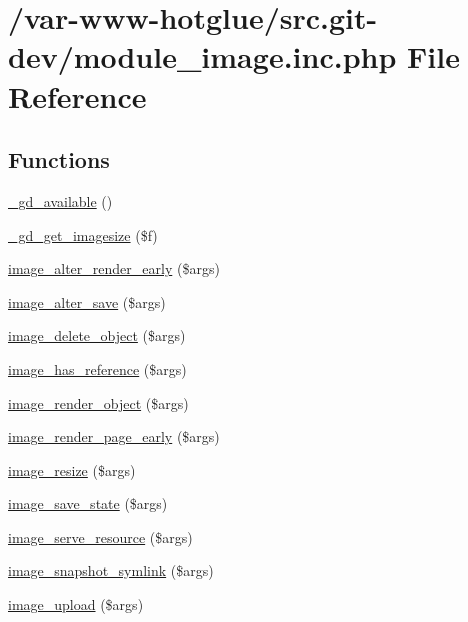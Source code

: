 \hypertarget{module__image_8inc_8php}{
\section{/var-\/www-\/hotglue/src.git-\/dev/module\_\-image.inc.php File Reference}
\label{module__image_8inc_8php}
}
\subsection*{Functions}
\begin{DoxyCompactItemize}
\item 
\hyperlink{module__image_8inc_8php_a574d6d760e50b88ffa815cab30a5e634}{\_\-gd\_\-available} ()
\item 
\hyperlink{module__image_8inc_8php_a3c76028c34273e722c9691243377a208}{\_\-gd\_\-get\_\-imagesize} (\$f)
\item 
\hyperlink{module__image_8inc_8php_ab52d6b71a5c26dbb7e86653652a23251}{image\_\-alter\_\-render\_\-early} (\$args)
\item 
\hyperlink{module__image_8inc_8php_a93578776fb38b10d47bc711cc3469ae9}{image\_\-alter\_\-save} (\$args)
\item 
\hyperlink{module__image_8inc_8php_a7cbcf6138ccff16a8b733cfd6f0f1666}{image\_\-delete\_\-object} (\$args)
\item 
\hyperlink{module__image_8inc_8php_a0bef6164f5eafe368d251639cf6fe298}{image\_\-has\_\-reference} (\$args)
\item 
\hyperlink{module__image_8inc_8php_a4fadded2a225d1b5ea73404a84597620}{image\_\-render\_\-object} (\$args)
\item 
\hyperlink{module__image_8inc_8php_a8266a74a11a86a73e2aa3709388fd43f}{image\_\-render\_\-page\_\-early} (\$args)
\item 
\hyperlink{module__image_8inc_8php_a9e03a71310133176236ae0bd4a0241e0}{image\_\-resize} (\$args)
\item 
\hyperlink{module__image_8inc_8php_ac26ea1448f0b7ed835907cf7c22b60ca}{image\_\-save\_\-state} (\$args)
\item 
\hyperlink{module__image_8inc_8php_abb6646bfaa6a012e620cdaaa0bc3c807}{image\_\-serve\_\-resource} (\$args)
\item 
\hyperlink{module__image_8inc_8php_a65d33fafe2da58d0f87f2df1fedbbe62}{image\_\-snapshot\_\-symlink} (\$args)
\item 
\hyperlink{module__image_8inc_8php_a37dee9de60e2852c0631d8e60e58585c}{image\_\-upload} (\$args)
\end{DoxyCompactItemize}



